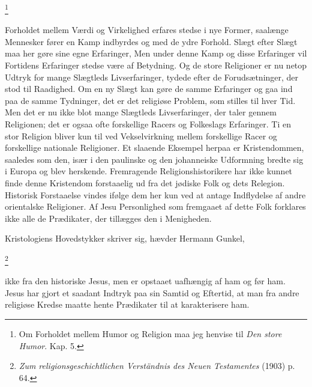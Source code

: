 \documentclass[12pt]{article}
\newcommand{\apage}[1]{\marginnote{\footnotesize\textit{[#1]}}}
\begin{document}
         \footnote{Om Forholdet mellem Humor og Religion maa jeg henvise til
\textit{Den store Humor}. Kap. 5.}

Forholdet mellem Værdi og Virkelighed erfares stedse i nye Former, saalænge
Mennesker fører en Kamp indbyrdes og med de ydre Forhold. Slægt efter Slægt maa
her gøre sine egne Erfaringer, Men under denne Kamp og disse Erfaringer vil
Fortidens Erfaringer stedse være af Betydning. Og de store Religioner er nu
netop Udtryk for mange Slægtleds Livserfaringer, tydede efter de
Forudsætninger, der stod til Raadighed. Om en ny Slægt kan gøre de samme
Erfaringer og gaa ind paa de samme Tydninger, det er det religiøse Problem, som
stilles til hver Tid. Men det er nu ikke blot mange Slægtleds Livserfaringer,
der taler gennem Religionen; det er ogsaa ofte forskellige Racers og Folkeslags
Erfaringer. Ti en stor Religion bliver kun til ved Vekselvirkning mellem
forskellige Racer og forskellige nationale Religioner. Et slaaende Eksempel
herpaa er Kristendommen, saaledes som den, især i den paulinske og den
johanneiske Udformning bredte sig i Europa og blev herskende. Fremragende
Religionshistorikere har ikke kunnet finde denne Kristendom forstaaelig ud fra
det jødiske Folk og dets Relegion. Historisk Forstaaelse vindes ifølge dem her
kun ved at antage Indflydelse af andre orientalske Religioner. Af Jesu
Personlighed som fremgaaet af dette Folk forklares ikke alle de Prædikater, der
tillægges den i Menigheden.

\guillemotright{}Kristologiens Hovedstykker skriver sig,\guillemotleft{} hævder
Hermann
\setcounter{footnote}{0}%
\apage{113}Gunkel,

         \footnote{\textit{Zum religionsgeschichtlichen Verständnis des Neuen
Testamentes }(1903) p. 64.}

       \guillemotright{}ikke fra den historiske Jesus, men er opstaaet
uafhængig af ham og før ham.\guillemotleft{} Jesus har gjort et saadant Indtryk
paa sin Samtid og Eftertid, at man fra andre religiøse Kredse maatte hente
Prædikater til at karakterisere ham.
\end{document}
